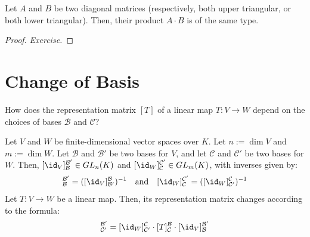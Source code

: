 \begin{lemma} \label{lemma:17.a.11}
Let $A$ and $B$ be two diagonal matrices (respectively, both upper triangular, or both lower triangular). Then, their product $A \cdot B$ is of the same type.
\end{lemma}

\begin{proof}
\textit{Exercise.}
\end{proof}

\section{Change of Basis}

\begin{question}
How does the representation matrix $[T]$ of a linear map $T: V \to W$ depend on the choices of bases $\mathcal{B}$ and $\mathcal{C}$?
\end{question}

\begin{corollary}
\label{cor:change_of_basis_formula}
Let $V$ and $W$ be finite-dimensional vector spaces over $K$. Let $n := \dim V$ and $m := \dim W$. Let $\mathcal{B}$ and $\mathcal{B}'$ be two bases for $V$, and let $\mathcal{C}$ and $\mathcal{C}'$ be two bases for $W$. Then, $[\id_V]_{\mathcal{B}}^{\mathcal{B}'} \in GL_n(K)$ and $[\id_W]_{\mathcal{C}}^{\mathcal{C}'} \in GL_m(K)$, with inverses given by:
\begin{equation*}
    [\id_V]_{\mathcal{B}}^{\mathcal{B}'} = ([\id_V]_{\mathcal{B}'}^{\mathcal{B}})^{-1} \quad \text{and} \quad [\id_W]_{\mathcal{C}}^{\mathcal{C}'} = ([\id_W]_{\mathcal{C}'}^{\mathcal{C}})^{-1}
\end{equation*}
Let $T: V \to W$ be a linear map. Then, its representation matrix changes according to the formula:
\begin{equation*}
    [T]_{\mathcal{C}'}^{\mathcal{B}'} = [\id_W]_{\mathcal{C}'}^{\mathcal{C}} \cdot [T]_{\mathcal{C}}^{\mathcal{B}} \cdot [\id_V]_{\mathcal{B}}^{\mathcal{B}'}
\end{equation*}
\end{corollary}

